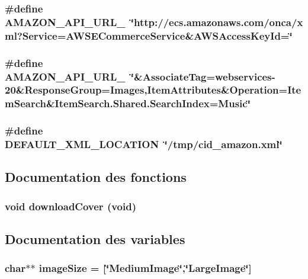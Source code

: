 \subsubsection{\setlength{\rightskip}{0pt plus 5cm}\#define AMAZON\_\-API\_\-URL\_~\char`\"{}http://ecs.amazonaws.com/onca/xml?Service=AWSECommerceService\&AWSAccessKeyId=\char`\"{}}\label{cid-amazon_8h_db45993977597ed740da90cea7770991}


\subsubsection{\setlength{\rightskip}{0pt plus 5cm}\#define AMAZON\_\-API\_\-URL\_~\char`\"{}\&AssociateTag=webservices-20\&ResponseGroup=Images,ItemAttributes\&Operation=ItemSearch\&ItemSearch.Shared.SearchIndex=Music\char`\"{}}\label{cid-amazon_8h_aed657bf0c21ffddf6efdee68c572272}


\subsubsection{\setlength{\rightskip}{0pt plus 5cm}\#define DEFAULT\_\-XML\_\-LOCATION~\char`\"{}/tmp/cid\_\-amazon.xml\char`\"{}}\label{cid-amazon_8h_f3519f33adfcd6d080db35732f47e206}




\subsection{Documentation des fonctions}
\subsubsection{\setlength{\rightskip}{0pt plus 5cm}void downloadCover (void)}\label{cid-amazon_8h_081b687c6c704de6f5c586a5470d849a}




\subsection{Documentation des variables}
\subsubsection{\setlength{\rightskip}{0pt plus 5cm}char$\ast$$\ast$ {\bf imageSize} = [\char`\"{}MediumImage\char`\"{},\char`\"{}LargeImage\char`\"{}]}\label{cid-amazon_8h_74c5d6e147a19c2aeec65255d0b1062f}


